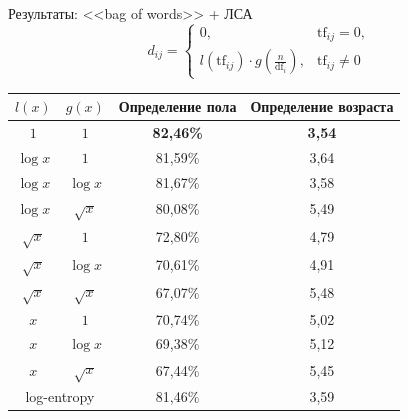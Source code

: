 \documentclass{beamer}
\begin{document}
\begin{frame}{Результаты: <<bag of words>> + ЛСА}
    \[d_{ij} = \begin{cases}
              0,& \mathrm{tf}_{ij} = 0,\\
              l(\mathrm{tf}_{ij}) \cdot g(\frac{n}{\mathrm{df}_{i}}),& \mathrm{tf}_{ij} \ne 0
        \end{cases}\]

\begin{table}[!h]
\centering
\begin{tabular}{|c|c|c|c|}\hline
    \boldmath$l(x)$ & \boldmath$g(x)$ & \textbf{Определение пола} & \textbf{Определение возраста} \\\hline
    $1$ & $1$ & \textbf{82,46\%} & \textbf{3,54} \\\hline
    $\log{x}$ & $1$ & 81,59\% & 3,64 \\\hline
    $\log{x}$ & $\log{x}$ & 81,67\% & 3,58 \\\hline
    $\log{x}$ & $\sqrt{x}$ & 80,08\% & 5,49 \\\hline
    $\sqrt{x}$ & $1$ & 72,80\% & 4,79 \\\hline
    $\sqrt{x}$ & $\log{x}$ & 70,61\% & 4,91 \\\hline
    $\sqrt{x}$ & $\sqrt{x}$ & 67,07\% & 5,48 \\\hline
    $x$ & $1$ & 70,74\% & 5,02 \\\hline
    $x$ & $\log{x}$ & 69,38\% & 5,12 \\\hline
    $x$ & $\sqrt{x}$ & 67,44\% & 5,45 \\\hline
    \multicolumn{2}{|c|}{log-entropy} & 81,46\% & 3,59 \\\hline
\end{tabular}
\end{table}
\end{frame}
\end{document}
